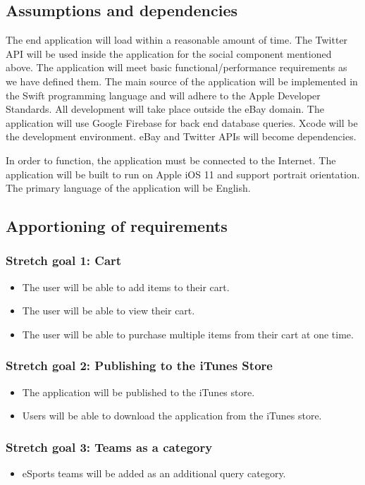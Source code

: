 \documentclass[onecolumn, draftclsnofoot,10pt, compsoc]{IEEEtran}
\begin{document}
\subsection{Assumptions and dependencies}
The end application will load within a reasonable amount of time. The Twitter API will be used inside the application for the social component mentioned above. The application will meet basic functional/performance requirements as we have defined them. The main source of the application will be implemented in the Swift programming language and will adhere to the Apple Developer Standards. All development will take place outside the eBay domain. The application will use Google Firebase for back end database queries. Xcode will be the development environment. eBay and Twitter APIs will become dependencies.
\par In order to function, the application must be connected to the Internet. The application will be built to run on Apple iOS 11 and support portrait orientation. The primary language of the application will be English.

\subsection{Apportioning of requirements}
\subsubsection{Stretch goal 1: Cart}
\begin{itemize}
\item The user will be able to add items to their cart.
\item The user will be able to view their cart.
\item The user will be able to purchase multiple items from their cart at one time.
\end{itemize}

\subsubsection{Stretch goal 2: Publishing to the iTunes Store}
\begin{itemize}
\item The application will be published to the iTunes store.
\item Users will be able to download the application from the iTunes store.
\end{itemize}

\subsubsection{Stretch goal 3: Teams as a category}
\begin{itemize}
\item eSports teams will be added as an additional query category.
\end{itemize}
\end{document}
